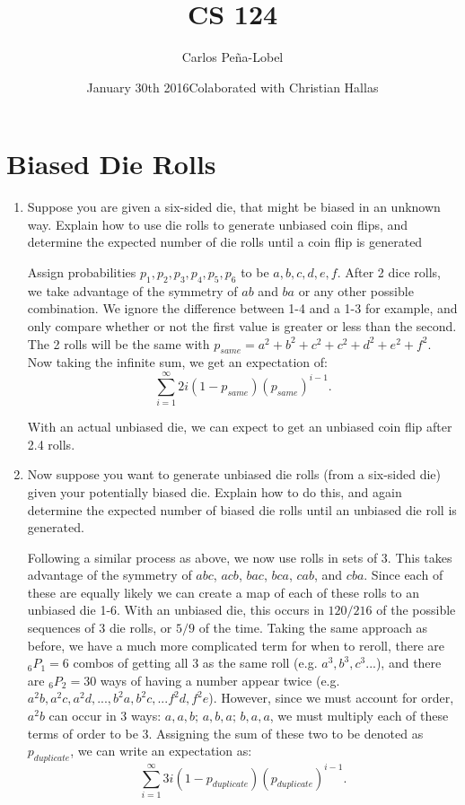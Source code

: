 \documentclass[11pt]{article}
\title{CS 124}
\author{Carlos Pe\~{n}a-Lobel}
\date{January 30th 2016}
\date{Colaborated with Christian Hallas}
\begin{document}
\maketitle

\section*{Biased Die Rolls}

\begin{enumerate}

\item Suppose you are given a six-sided die, that might be biased in
an unknown way. Explain how to use die rolls to generate unbiased coin
flips, and determine the expected number of die rolls until a coin
flip is generated

\begin{adjustwidth}{.5cm}{}

    Assign probabilities $p_1, p_2, p_3, p_4, p_5, p_6$ to be $a, b, c, d, e, f$.  After 2 dice rolls, we take advantage of the symmetry of $ab$ and $ba$ or any other possible combination.  We ignore the difference between 1-4 and a 1-3 for example, and only compare whether or not the first value is greater or less than the second.  The 2 rolls will be the same with $p_{same} = a^2 +b^2+c^2+c^2+d^2+e^2+f^2$.  Now taking the infinite sum, we get an expectation of: $$\sum_{i=1}^{\infty} 2i\left(1-p_{same}\right)\left(p_{same}\right)^{i-1}.$$
    
    With an actual unbiased die, we can expect to get an unbiased coin flip after 2.4 rolls. 

\end{adjustwidth}

\item Now suppose you want to generate unbiased die
rolls (from a six-sided die) given your potentially biased die.
Explain how to do this, and again determine the expected number of
biased die rolls until an unbiased die roll is generated.

\begin{adjustwidth}{.5cm}{}
    Following a similar process as above, we now use rolls in sets of 3.  This takes advantage of the symmetry of $abc$, $acb$, $bac$, $bca$, $cab$, and $cba$.  Since each of these are equally likely we can create a map of each of these rolls to an unbiased die 1-6.  With an unbiased die, this occurs in $120/216$ of the possible sequences of 3 die rolls, or $5/9$ of the time.  Taking the same approach as before, we have a much more complicated term for when to reroll, there are $_{6} P_{1} = 6$ combos of getting all 3 as the same roll (e.g. $a^3, b^3, c^3$...), and there are $_{6} P_{2} = 30$ ways of having a number appear twice (e.g. $a^2b, a^2c, a^2d, ..., b^2a, b^2c, ... f^2d, f^2e$).  However, since we must account for order, $a^2b$ can occur in 3 ways: $a,a,b;\, a,b,a;\, b,a,a$, we must multiply each of these terms of order to be 3.  Assigning the sum of these two to be denoted as $p_{duplicate}$, we can write an expectation as: $$\sum_{i=1}^{\infty} 3i\left(1-p_{duplicate}\right)\left(p_{duplicate}\right)^{i-1}.$$
    

\end{adjustwidth}
\end{enumerate}
\end{document}
